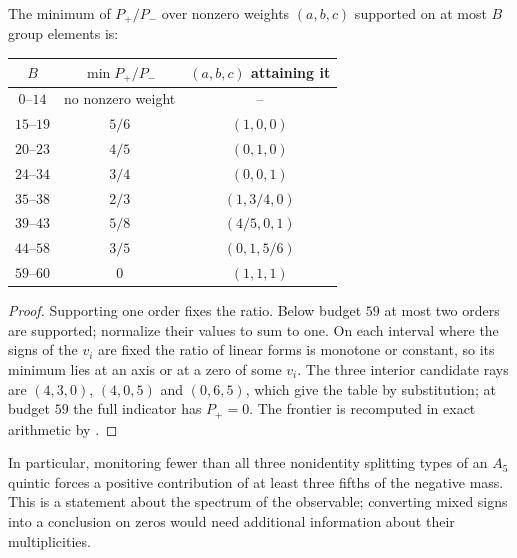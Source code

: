 \begin{proposition}\label{nab:prop:a5frontier}
The minimum of $P_+/P_-$ over nonzero weights $(a,b,c)$ supported on at most $B$ group
elements is:
\begin{center}
\begin{tabular}{c|c|c}
$B$ & $\min P_+/P_-$ & $(a,b,c)$ attaining it\\\hline
$0$--$14$ & no nonzero weight & --\\
$15$--$19$ & $5/6$ & $(1,0,0)$\\
$20$--$23$ & $4/5$ & $(0,1,0)$\\
$24$--$34$ & $3/4$ & $(0,0,1)$\\
$35$--$38$ & $2/3$ & $(1,3/4,0)$\\
$39$--$43$ & $5/8$ & $(4/5,0,1)$\\
$44$--$58$ & $3/5$ & $(0,1,5/6)$\\
$59$--$60$ & $0$ & $(1,1,1)$
\end{tabular}
\end{center}
\end{proposition}
\begin{proof}
Supporting one order fixes the ratio. Below budget $59$ at most two orders are supported;
normalize their values to sum to one. On each interval where the signs of the $v_i$ are
fixed the ratio of linear forms is monotone or constant, so its minimum lies at an axis or
at a zero of some $v_i$. The three interior candidate rays are $(4,3,0)$, $(4,0,5)$ and
$(0,6,5)$, which give the table by substitution; at budget $59$ the full indicator has
$P_+=0$. The frontier is recomputed in exact arithmetic by
.
\end{proof}

In particular, monitoring fewer than all three nonidentity splitting types of an $A_5$
quintic forces a positive contribution of at least three fifths of the negative mass. This
is a statement about the spectrum of the observable; converting mixed signs into a
conclusion on zeros would need additional information about their multiplicities.


